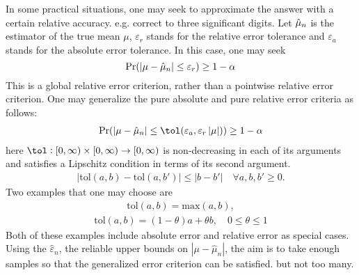 \documentclass{iitthesis}
\begin{document}
In some practical situations, one may seek to approximate the answer with a certain relative accuracy. e.g. correct to three significant digits. Let $\hat{\mu}_n$ is the estimator of the true mean $\mu$, $\varepsilon_r$ stands for the relative error tolerance and $\varepsilon_a$ stands for the absolute error tolerance. In this case, one may seek 
$$\Pr(\left \lvert \mu-\hat{\mu}_n \right \rvert\leq \varepsilon_r) \geq 1-\alpha$$
This is a global relative error criterion, rather than a pointwise relative error criterion.
One may generalize the pure absolute and pure relative error criteria as follows:
\begin{align}\label{hybridCI}
\Pr(\abs{\mu-\hmu_n}\leq \tol(\varepsilon_a, \varepsilon_r\abs{\mu})) \geq 1-\alpha
\end{align}
here $\tol: [0, \infty) \times [0, \infty) \to [0,\infty)$ is non-decreasing in each of its arguments and satisfies a Lipschitz condition in terms of its second argument.
\begin{align}
|\text{tol}(a,b)-\text{tol}(a,b')| \leq |b-b'| \quad \forall a,b,b' \geq 0.
\end{align}
Two examples that one may choose are
\begin{align}
\text{tol}(a,b) = \text{max} (a,b),
\end{align}
\begin{align}
\text{tol}(a,b) = (1- \theta) a + \theta b, \quad 0 \leq \theta \leq 1
\end{align}
Both of these examples include absolute error and relative error as special cases.
Using the $\hat{\varepsilon}_n$, the reliable upper bounds on $|\mu-\hat{\mu}_n|$, the aim is to take enough samples so that the generalized error criterion can be satisfied. but not too many.

\end{document}
